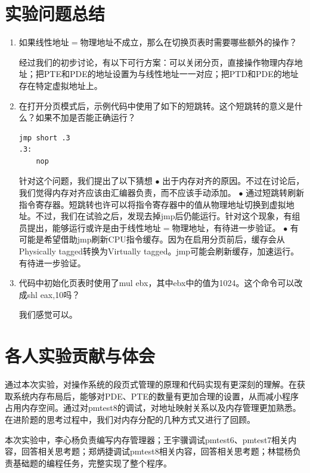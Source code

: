 \documentclass[UTF8,12pt]{ctexart}
\begin{document}
    \section{实验问题总结}
    \begin{enumerate}
    \item 如果线性地址$=$物理地址不成立，那么在切换页表时需要哪些额外的操作？
    
    经过我们的初步讨论，有以下可行方案：可以关闭分页，直接操作物理内存地址；把PTE和PDE的地址设置为与线性地址一一对应；把PTD和PDE的地址存在特定虚拟地址上。
    
    \item 在打开分页模式后，示例代码中使用了如下的短跳转。这个短跳转的意义是什么？如果不加是否能正确运行？
    \begin{lstlisting}[language={[x86masm]Assembler}]
    jmp	short .3
.3:
	nop
    \end{lstlisting}
    针对这个问题，我们提出了以下猜想
    $\bullet$ 出于内存对齐的原因。不过在讨论后，我们觉得内存对齐应该由汇编器负责，而不应该手动添加。
    $\bullet$ 通过短跳转刷新指令寄存器。短跳转也许可以将指令寄存器中的值从物理地址切换到虚拟地址。不过，我们在试验之后，发现去掉jmp后仍能运行。针对这个现象，有组员提出，能够运行或许是由于线性地址$=$物理地址，有待进一步验证。
    $\bullet$ 有可能是希望借助jmp刷新CPU指令缓存。因为在启用分页前后，缓存会从Physically tagged转换为Virtually tagged。jmp可能会刷新缓存，加速运行。有待进一步验证。    
    \item 代码中初始化页表时使用了mul ebx，其中ebx中的值为1024。这个命令可以改成shl eax,10吗？
    
    我们感觉可以。
    \end{enumerate}

    
    \section{各人实验贡献与体会}
    通过本次实验，对操作系统的段页式管理的原理和代码实现有更深刻的理解。在获取系统内存布局后，能够对PDE、PTE的数量有更加合理的设置，从而减小程序占用内存空间。通过对pmtest8的调试，对地址映射关系以及内存管理更加熟悉。在进阶题的思考过程中，我们对内存分配的几种方式又进行了回顾。
    
    本次实验中，李心杨负责编写内存管理器；王宇骥调试pmtest6、pmtest7相关内容，回答相关思考题；郑炳捷调试pmtest8相关内容，回答相关思考题；林锟杨负责基础题的编程任务，完整实现了整个程序。
    
\end{document}
